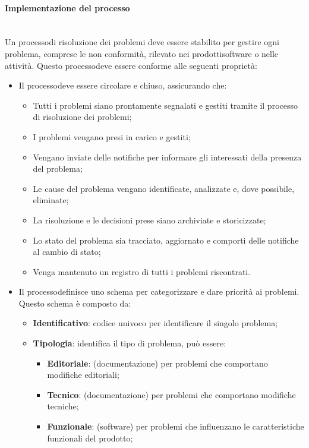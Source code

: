\paragraph{Implementazione del processo}\mbox{}\\ [1mm]
Un processo\glosp di risoluzione dei problemi deve essere stabilito per gestire ogni problema, comprese le non conformità, rilevato nei prodotti\glosp software o nelle attività. Questo processo\glosp deve essere conforme alle seguenti proprietà:
\begin{itemize}
	\item Il processo\glosp deve essere circolare e chiuso, assicurando che:
	\begin{itemize} 
		\item Tutti i problemi siano prontamente segnalati e gestiti tramite il processo di risoluzione dei problemi;
		\item I problemi vengano presi in carico e gestiti;
		\item Vengano inviate delle notifiche per informare gli interessati della presenza del problema;
		\item Le cause del problema vengano identificate, analizzate e, dove possibile, eliminate;
		\item La risoluzione e le decisioni prese siano archiviate e storicizzate;
		\item Lo stato del problema sia tracciato, aggiornato e comporti delle notifiche al cambio di stato;
		\item Venga mantenuto un registro di tutti i problemi riscontrati.
	\end{itemize}
	\item Il processo\glosp definisce uno schema per categorizzare e dare priorità ai problemi. Questo schema è composto da:
	\begin{itemize} 
		\item \textbf{Identificativo}: codice univoco per identificare il singolo problema;
		\item \textbf{Tipologia}: identifica il tipo di problema, può essere:
		\begin{itemize}
			\item \textbf{Editoriale}: (documentazione) per problemi che comportano modifiche editoriali\glo;
			\item \textbf{Tecnico}: (documentazione) per problemi che comportano modifiche tecniche\glo;
			\item \textbf{Funzionale}: (software) per problemi che influenzano le caratteristiche funzionali del prodotto\glo;

\end{itemize}
\end{itemize}
\end{itemize}
